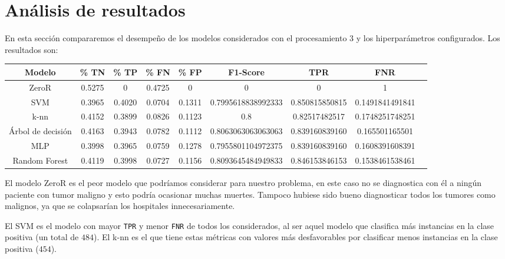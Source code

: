 \documentclass[a4]{article}
\begin{document}
\section{Análisis de resultados}

En esta sección compararemos el desempeño de los modelos considerados con el procesamiento $3$ y los hiperparámetros configurados. Los resultados son:

\begin{center}
\begin{tabular}{|c|c|c|c|c|c|c|c|c|}
\hline
\multicolumn{1}{|c|}{\textbf{Modelo}} & \textbf{\% TN} & \textbf{\% TP} & \textbf{\% FN} & \textbf{\% FP} & \textbf{F1-Score} & \textbf{TPR} & \textbf{FNR}  \\ \hline
  ZeroR             & 0.5275 & 0   & 0.4725 & 0   & 0                  & 0              & 1                \\ \hline
  SVM               & 0.3965 & 0.4020 & 0.0704  & 0.1311 & 0.7995618838992333 & 0.850815850815 & 0.1491841491841  \\ \hline
  k-nn              & 0.4152 & 0.3899 & 0.0826  & 0.1123 & 0.8                & 0.82517482517  & 0.1748251748251  \\ \hline
  Árbol de decisión & 0.4163 & 0.3943 & 0.0782  & 0.1112 & 0.8063063063063063 & 0.839160839160 & 0.165501165501   \\ \hline
  MLP               & 0.3998 & 0.3965 & 0.0759  & 0.1278 & 0.7955801104972375 & 0.839160839160 & 0.1608391608391  \\ \hline
  Random Forest     & 0.4119 & 0.3998 & 0.0727  & 0.1156 & 0.8093645484949833 & 0.846153846153 & 0.1538461538461  \\ \hline
\end{tabular}
\end{center}

\vspace{1mm}

El modelo ZeroR es el peor modelo que podríamos considerar para nuestro problema, en este caso no se diagnostica con él a ningún paciente con tumor maligno y esto podría ocasionar muchas muertes. Tampoco hubiese sido bueno diagnosticar todos los tumores como malignos, ya que se colapsarían los hospitales innecesariamente.

El SVM es el modelo con mayor \texttt{TPR} y menor \texttt{FNR} de todos los considerados, al ser aquel modelo que clasifica más instancias en la clase positiva (un total de $484$). El k-nn es el que tiene estas métricas con valores más desfavorables por clasificar menos instancias en la clase positiva ($454$).
\end{document}
